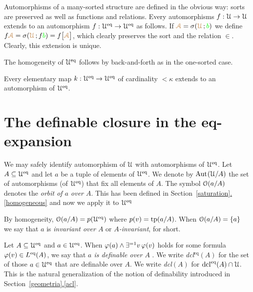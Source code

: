\documentclass[creche.tex]{subfiles}
\begin{document}
Automorphisms of a many-sorted structure are defined in the obvious way: sorts are preserved as well as functions and relations. Every automorphisms $f:\EuScript U\rightarrow\EuScript U$ extends to an automorphism $f:\EuScript U^{{\rm eq}}\rightarrow\EuScript U^{{\rm eq}}$ as follows.  If ${\color{brown}\EuScript A}=\sigma({\color{brown}\EuScript U}\,;{\color{green} b})$ we define $f{\color{brown}\EuScript A}=\sigma({\color{brown}\EuScript U}\,;f{\color{green} b})=f\big[{\color{brown}\EuScript A}\big]$, which clearly preserves the sort and the relation $\in$. Clearly, this extension is unique.

The homogeneity of $\EuScript U^{{\rm eq}}$ follows by back-and-forth as in the one-sorted case.

\begin{proposition}\label{prop_Ueq_homogeneous}
Every elementary map $k:\EuScript U^{{\rm eq}}\to\EuScript U^{{\rm eq}}$ of cardinality $<\kappa$ extends to an automorphism of $\EuScript U^{{\rm eq}}$.\QED
\end{proposition} 




\section{The definable closure in the eq-expansion}
We may safely identify automorphism of $\EuScript U$ with automorphisms of $\EuScript U^{{\rm eq}}$. Let $A\subseteq\EuScript U^{{\rm eq}}$ and let $a$ be a tuple of elements of $\EuScript U^{{{\rm eq}}}$. We denote by \emph{$\textrm{Aut\kern.15ex}(\EuScript U/A)$\/} the set of automorphisms (of $\EuScript U^{{\rm eq}}$) that fix all elements of $A$. The symbol \emph{$\EuScript O(a/A)$\/} denotes the \emph{orbit of $a$ over $A$}. This has been defined in Section~\hyperref[homogeneous]{\ref*{saturation}.\ref*{homogeneous}} and now we apply it to $\EuScript U^{{\rm eq}}$


By homogeneity, $\EuScript O(a/A)=p(\EuScript U^{{\rm eq}})$ where $p(v)={\rm tp}(a/A)$. When $\EuScript O(a/A)=\{a\}$ we say that $a$ is \emph{invariant over $A$\/} or \emph{$A$-invariant}, for short.


\begin{definition}\label{def_def}
Let $A\subseteq\EuScript U^{{\rm eq}}$ and $a\in\EuScript U^{{\rm eq}}$. When $\varphi(a)\wedge\exists^{=1}v\,\varphi(v)$ holds for some formula $\varphi(v)\in L^{{\rm eq}}(A)$, we say that \emph{$a$ is definable over $A$\/} . We write \emph{dcl$^\textrm{eq}(A)$\/} for the set of those $a\in\EuScript U^{{\rm eq}}$ that are definable over $A$. We write \emph{dcl$(A)$\/} for $\mathop{\rm dcl}^{{\rm eq}}(A)\cap\EuScript U$. This is the natural generalization of the notion of definability introduced in Section~\hyperref[acl]{\ref*{geometria}.\ref*{acl}}.\QED
\end{definition}
\end{document}
